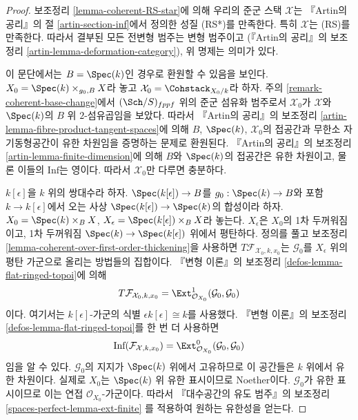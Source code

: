 \begin{proof}
보조정리 \ref{lemma-coherent-RS-star}에 의해 우리의 준군 스택
$\mathcal{X}$는 『Artin의 공리』의 절 \ref{artin-section-inf}에서
정의한 성질 (RS*)를 만족한다. 특히 $\mathcal{X}$는 (RS)를 만족한다.
따라서 결부된 모든 전변형 범주는 변형 범주이고
(『Artin의 공리』의 보조정리 \ref{artin-lemma-deformation-category}),
위 명제는 의미가 있다.

\medskip\noindent
이 문단에서는 $B = \Spec(k)$인 경우로 환원할 수 있음을 보인다.
$X_0 = \Spec(k) \times_{g_0, B} X$라 놓고
$\mathcal{X}_0 = \Cohstack_{X_0/k}$라 하자.
주의 \ref{remark-coherent-base-change}에서 $(\Sch/S)_{fppf}$ 위의
준군 섬유화 범주로서 $\mathcal{X}_0$가 $\mathcal{X}$와
$\Spec(k)$의 $B$ 위 $2$-섬유곱임을 보았다.
따라서 『Artin의 공리』의 보조정리
\ref{artin-lemma-fibre-product-tangent-spaces}에 의해
$B$, $\Spec(k)$, $\mathcal{X}_0$의 접공간과 무한소 자기동형공간이
유한 차원임을 증명하는 문제로 환원된다. 『Artin의 공리』의 보조정리
\ref{artin-lemma-finite-dimension}에 의해 $B$와 $\Spec(k)$의
접공간은 유한 차원이고, 물론 이들의 $\text{Inf}$는 영이다.
따라서 $\mathcal{X}_0$만 다루면 충분하다.

\medskip\noindent
$k[\epsilon]$을 $k$ 위의 쌍대수라 하자.
$\Spec(k[\epsilon]) \to B$를 $g_0 : \Spec(k) \to B$와 포함
$k \to k[\epsilon]$에서 오는 사상
$\Spec(k[\epsilon]) \to \Spec(k)$의 합성이라 하자.
$X_0 = \Spec(k) \times_B X$,
$X_\epsilon = \Spec(k[\epsilon]) \times_B X$라 놓는다.
$X_\epsilon$은 $X_0$의 1차 두꺼워짐이고, 1차 두꺼워짐
$\Spec(k) \to \Spec(k[\epsilon])$ 위에서 평탄하다.
정의를 풀고 보조정리
\ref{lemma-coherent-over-first-order-thickening}을 사용하면
$T\mathcal{F}_{\mathcal{X}_0, k, x_0}$는 $\mathcal{G}_0$를
$X_\epsilon$ 위의 평탄 가군으로 올리는 방법들의 집합이다.
『변형 이론』의 보조정리 \ref{defos-lemma-flat-ringed-topoi}에 의해
$$
T\mathcal{F}_{\mathcal{X}_0, k, x_0} =
\Ext^1_{\mathcal{O}_{X_0}}(\mathcal{G}_0, \mathcal{G}_0)
$$
이다. 여기서는 $k[\epsilon]$-가군의 식별
$\epsilon k[\epsilon] \cong k$를 사용했다.
『변형 이론』의 보조정리 \ref{defos-lemma-flat-ringed-topoi}를
한 번 더 사용하면
$$
\text{Inf}(\mathcal{F}_{\mathcal{X}, k, x_0}) =
\Ext^0_{\mathcal{O}_{X_0}}(\mathcal{G}_0, \mathcal{G}_0)
$$
임을 알 수 있다.
$\mathcal{G}_0$의 지지가 $\Spec(k)$ 위에서 고유하므로 이 공간들은
$k$ 위에서 유한 차원이다. 실제로 $X_0$는 $\Spec(k)$ 위 유한
표시이므로 Noether이다. $\mathcal{G}_0$가 유한 표시이므로 이는
연접 $\mathcal{O}_{X_0}$-가군이다. 따라서
『대수공간의 유도 범주』의 보조정리
\ref{spaces-perfect-lemma-ext-finite}
를 적용하여 원하는 유한성을 얻는다.
\end{proof}


